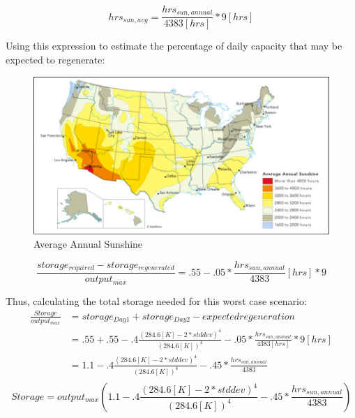 \begin{equation}
hrs_{sun,avg}=\frac{hrs_{sun,annual}}{4383 [hrs]}*9 [hrs]
\end{equation}

Using this expression to estimate the percentage of daily capacity that may be
expected to regenerate:

\begin{figure}
\begin{center}
\includegraphics[scale=0.6]{pics/PatrickFigure4.png}
\caption{Average Annual Sunshine}
\label{p4}
\end{center}
\end{figure}

\begin{equation}
\frac{storage_{required}-storage_{regenerated}}{output_{max}} =
.55-.05*\frac{hrs_{sun,annual}}{4383} [hrs]*9
\end{equation}

Thus, calculating the total storage needed for this worst case scenario:
\begin{equation}
\begin{aligned}
\frac{Storage}{output_{max}}&=storage_{Day1}+storage_{Day2}-expected
regeneration
\\
&=.55+.55-.4\frac{(284.6[K]-2*stddev)^4}{(284.6[K])^4}-.05*\frac{hrs_{sun,annual}}{4383
[hrs]}*9 [hrs] \\
&=1.1-.4\frac{(284.6[K]-2*stddev)^4}{(284.6
[K])^4}-.45*\frac{hrs_{sun,annual}}{4383}  \\
\end{aligned}
\end{equation}
\begin{equation}
Storage=output_{max}(1.1-.4\frac{(284.6[K]-2*stddev)^4}{(284.6
[K])^4}-.45*\frac{hrs_{sun,annual}}{4383})
\end{equation}

